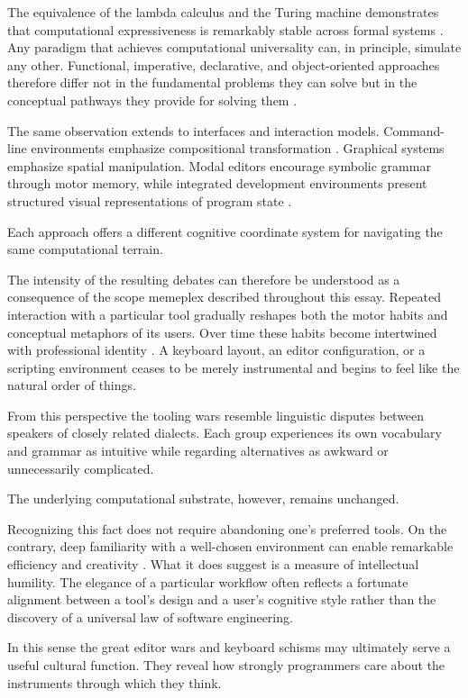 \documentclass[11pt]{article}
\theoremstyle{definition}
\begin{document}
The equivalence of the lambda calculus and the Turing machine
demonstrates that computational expressiveness is remarkably stable
across formal systems \cite{church1936,turing1936,kleene1952}. Any
paradigm that achieves computational universality can, in principle,
simulate any other. Functional, imperative, declarative, and
object-oriented approaches therefore differ not in the fundamental
problems they can solve but in the conceptual pathways they provide for
solving them \cite{backus1978}.

The same observation extends to interfaces and interaction models.
Command-line environments emphasize compositional transformation
\cite{ritchie1974,mcilroy1978}. Graphical systems emphasize spatial
manipulation. Modal editors encourage symbolic grammar through motor
memory, while integrated development environments present structured
visual representations of program state \cite{norman1988}.

Each approach offers a different cognitive coordinate system for
navigating the same computational terrain.

The intensity of the resulting debates can therefore be understood as a
consequence of the scope memeplex described throughout this essay.
Repeated interaction with a particular tool gradually reshapes both the
motor habits and conceptual metaphors of its users. Over time these
habits become intertwined with professional identity
\cite{norman1988,brooks1975}. A keyboard layout, an editor configuration,
or a scripting environment ceases to be merely instrumental and begins
to feel like the natural order of things.

From this perspective the tooling wars resemble linguistic disputes
between speakers of closely related dialects. Each group experiences its
own vocabulary and grammar as intuitive while regarding alternatives as
awkward or unnecessarily complicated.

The underlying computational substrate, however, remains unchanged.

Recognizing this fact does not require abandoning one's preferred tools.
On the contrary, deep familiarity with a well-chosen environment can
enable remarkable efficiency and creativity \cite{knuth1984}. What it
does suggest is a measure of intellectual humility. The elegance of a
particular workflow often reflects a fortunate alignment between a
tool's design and a user's cognitive style rather than the discovery of
a universal law of software engineering.

In this sense the great editor wars and keyboard schisms may ultimately
serve a useful cultural function. They reveal how strongly programmers
care about the instruments through which they think.
\end{document}
